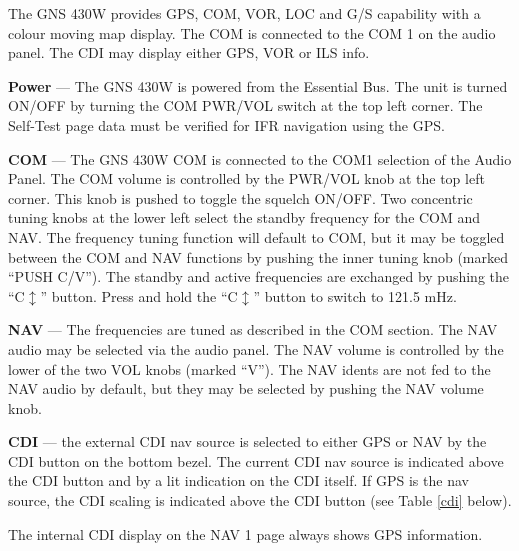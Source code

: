 The GNS 430W provides GPS, COM, VOR, LOC and G/S capability with a colour moving map display. The COM is connected to the COM 1 on the audio panel. The CDI may display either GPS, VOR or ILS info.

\textbf{Power} --- The GNS 430W is powered from the Essential Bus. The unit is turned ON/OFF by turning the COM PWR/VOL switch at the top left corner. The Self-Test page data must be verified for IFR navigation using the GPS.

\textbf{COM} --- The GNS 430W COM is connected to the COM1 selection of the Audio Panel. The COM volume is controlled by the PWR/VOL knob at the top left corner. This knob is pushed to toggle the squelch ON/OFF. Two concentric tuning knobs at the lower left select the standby frequency for the COM and NAV. The frequency tuning function will default to COM, but it may be toggled between the COM and NAV functions by pushing the inner tuning knob (marked ``PUSH C/V''). The standby and active frequencies are exchanged by pushing the ``C$\updownarrow$'' button.  Press and hold the ``C$\updownarrow$'' button to switch to 121.5 mHz.

\textbf{NAV} --- The frequencies are tuned as described in the COM section. The NAV audio may be selected via the audio panel. The NAV volume is controlled by the lower of the two VOL knobs (marked ``V''). The NAV idents are not fed to the NAV audio by default, but they may be selected by pushing the NAV volume knob.

\textbf{CDI} --- the external CDI nav source is selected to either GPS or NAV by the CDI button on the bottom bezel. The current CDI nav source is indicated above the CDI button and by a lit indication on the CDI itself. If GPS is the nav source, the CDI scaling is indicated above the CDI button (see Table \ref{cdi} below).

\begin{Note}
\centering
The internal CDI display on the NAV 1 page always shows GPS information.
\end{Note}
\raggedright

